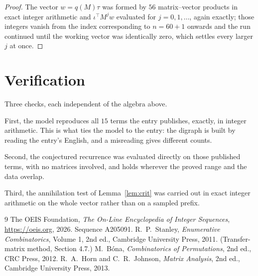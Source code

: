 \documentclass[11pt,a4paper]{article}
\theoremstyle{plain}
\theoremstyle{definition}
\begin{document}
\begin{proof}
The vector $w=q(M)\tau$ was formed by $56$ matrix--vector products in exact integer
arithmetic and $\iota^{\!\top}M^{j}w$ evaluated for $j=0,1,\dots$, again exactly; those
integers vanish from the index corresponding to $n=60+1$ onwards and the run continued
until the working vector was identically zero, which settles every larger $j$ at once.
\end{proof}

\section{Verification}

Three checks, each independent of the algebra above.

First, the model reproduces all $15$ terms the entry publishes, exactly, in integer
arithmetic. This is what ties the model to the entry: the digraph is built by reading the
entry's English, and a misreading gives different counts.

Second, the conjectured recurrence was evaluated directly on those published terms, with no
matrices involved, and holds wherever the proved range and the data overlap.

Third, the annihilation test of Lemma~\ref{lem:crit} was carried out in exact integer
arithmetic on the whole vector rather than on a sampled prefix.

\begin{thebibliography}{9}
 The OEIS Foundation, \emph{The On-Line Encyclopedia of Integer
Sequences}, \url{https://oeis.org}, 2026. Sequence A205091.
 R.~P.~Stanley, \emph{Enumerative Combinatorics}, Volume 1, 2nd ed.,
Cambridge University Press, 2011. (Transfer-matrix method, Section 4.7.)
 M.~B\'ona, \emph{Combinatorics of Permutations}, 2nd ed., CRC
Press, 2012.
 R.~A.~Horn and C.~R.~Johnson, \emph{Matrix Analysis}, 2nd ed., Cambridge
University Press, 2013.
\end{thebibliography}
\end{document}
